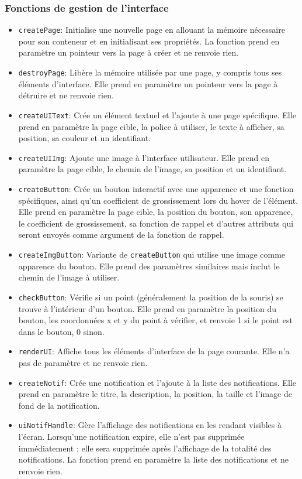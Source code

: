 \documentclass[11pt,a4paper]{article}
\begin{document}
\subsubsection{Fonctions de gestion de l'interface} 
\begin{itemize} 
    \item \texttt{createPage}: Initialise une nouvelle page en allouant la mémoire nécessaire pour son conteneur et en initialisant ses propriétés. La fonction prend en paramètre un pointeur vers la page à créer et ne renvoie rien.
    \item \texttt{destroyPage}: Libère la mémoire utilisée par une page, y compris tous ses éléments d'interface. Elle prend en paramètre un pointeur vers la page à détruire et ne renvoie rien.
    \item \texttt{createUIText}: Crée un élément textuel et l'ajoute à une page spécifique. Elle prend en paramètre la page cible, la police à utiliser, le texte à afficher, sa position, sa couleur et un identifiant.
    \item \texttt{createUIImg}: Ajoute une image à l'interface utilisateur. Elle prend en paramètre la page cible, le chemin de l'image, sa position et un identifiant.
    \item \texttt{createButton}: Crée un bouton interactif avec une apparence et une fonction spécifiques, ainsi qu'un coefficient de grossissement lors du hover de l'élément. Elle prend en paramètre la page cible, la position du bouton, son apparence, le coefficient de grossissement, sa fonction de rappel et d'autres attributs qui seront envoyés comme argument de la fonction de rappel.
    \item \texttt{createImgButton}: Variante de \texttt{createButton} qui utilise une image comme apparence du bouton. Elle prend des paramètres similaires mais inclut le chemin de l'image à utiliser.
    \item \texttt{checkButton}: Vérifie si un point (généralement la position de la souris) se trouve à l'intérieur d'un bouton. Elle prend en paramètre la position du bouton, les coordonnées x et y du point à vérifier, et renvoie 1 si le point est dans le bouton, 0 sinon.
    \item \texttt{renderUI}: Affiche tous les éléments d'interface de la page courante. Elle n'a pas de paramètre et ne renvoie rien.
    \item \texttt{createNotif}: Crée une notification et l'ajoute à la liste des notifications. Elle prend en paramètre le titre, la description, la position, la taille et l'image de fond de la notification.
    \item \texttt{uiNotifHandle}: Gère l'affichage des notifications en les rendant visibles à l'écran. Lorsqu’une notification expire, elle n’est pas supprimée immédiatement ; elle sera supprimée après l'affichage de la totalité des notifications. La fonction prend en paramètre la liste des notifications et ne renvoie rien.
\end{itemize}
\end{document}
